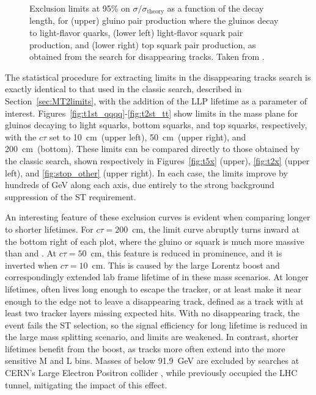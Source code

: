 \begin{figure}[htbp]
    \caption[Exclusion limits at 95\% \CL on gluino, light squark, and top squark pair production cross sections as a function of \chargino proper decay length, in the disappearing tracks search.]
      {Exclusion limits at 95\% \CL on $\sigma/\sigma_{\mathrm{theory}}$ as a function of the \chargino decay length, for
      (upper) gluino pair production where the gluinos decay to light-flavor quarks, (lower left) light-flavor squark pair production,
      and (lower right) top squark pair production, as obtained from the search for disappearing tracks. Taken from \cite{MT2_2019}.}
    \label{fig:limits2fixedmasses}
  \end{figure}
  
  The statistical procedure for extracting limits in the disappearing tracks search is exactly identical to that used in the classic search, described in Section~\ref{sec:MT2limits}, with the addition of the LLP lifetime as a parameter of interest.
  Figures~\ref{fig:t1st_qqqq}-\ref{fig:t2st_tt} show limits in the mass plane for gluinos decaying to light squarks, bottom squarks, and top squarks, respectively, with the \chargino $c\tau$ set to 10~cm~(upper left), 50~cm~(upper right), and 200~cm~(bottom).
  These limits can be compared directly to those obtained by the classic search, shown respectively in Figures~\ref{fig:t5x} (upper), \ref{fig:t2x} (upper left), and \ref{fig:stop_other} (upper right).
  In each case, the limits improve by hundreds of GeV along each axis, due entirely to the strong background suppression of the ST requirement.
  
  An interesting feature of these exclusion curves is evident when comparing longer to shorter \chargino lifetimes.
  For $c\tau = 200$~cm, the limit curve abruptly turns inward at the bottom right of each plot, where the gluino or squark is much more massive than \chargino and \lsp.
  At $c\tau = 50$~cm, this feature is reduced in prominence, and it is inverted when $c\tau = 10$~cm.
  This is caused by the large Lorentz boost and correspondingly extended lab frame lifetime of \chargino in these mass scenarios.
  At longer lifetimes, \chargino often lives long enough to escape the tracker, or at least make it near enough to the edge not to leave a disappearing track, defined as a track with at least two tracker layers missing expected hits.
  With no disappearing track, the event fails the ST selection, so the signal efficiency for long \chargino lifetime is reduced in the large mass splitting scenario, and limits are weakened.
  In contrast, shorter lifetimes benefit from the boost, as tracks more often extend into the more sensitive M and L bins.
  Masses of \chargino below 91.9~GeV are excluded by searches at CERN's Large Electron Positron collider \cite{lep_chargino}, while previously occupied the LHC tunnel, mitigating the impact of this effect.


